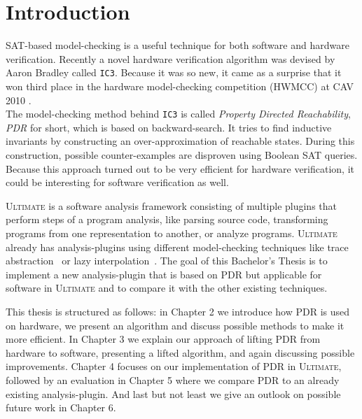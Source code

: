 \documentclass[11pt, a4paper, BCOR=10mm, ngerman]{scrbook}
\begin{document}
\tableofcontents


\mainmatter

\chapter{Introduction}
SAT-based model-checking is a useful technique for both software and hardware verification. 
Recently a novel hardware verification algorithm was devised by Aaron Bradley \cite{DBLP:conf/vmcai/Bradley11} called \texttt{IC3}.
Because it was so new, it came as a surprise that it won third place in the hardware
model-checking competition (HWMCC) at CAV 2010 \cite{cav}. \\ The model-checking method behind \texttt{IC3} is called \textsl{Property Directed Reachability}, \textsl{PDR} for short, which is based on backward-search. It tries to find inductive invariants by constructing an over-approximation of reachable states. During this construction, possible counter-examples are disproven using Boolean SAT queries. Because this approach turned out to be very efficient for hardware verification, it could be interesting for software verification as well. \par
\textsc{\textsc{Ultimate}} \cite{Zitat02} is a software analysis framework consisting of multiple plugins that perform steps of a program analysis, like parsing source code, transforming programs from one representation to another, or analyze programs.
 \textsc{\textsc{Ultimate}} already has analysis-plugins using different model-checking techniques like trace abstraction~\cite{DBLP:conf/cav/HeizmannHP13} or lazy interpolation~\cite{DBLP:conf/popl/HenzingerJMS02}.
The goal of this Bachelor's Thesis is to implement a new analysis-plugin that is based on PDR but applicable for software in \textsc{\textsc{Ultimate}} and to compare it with the other existing techniques. \par

This thesis is structured as follows: in Chapter 2 we introduce how PDR is used on hardware, we present an algorithm and discuss possible methods to make it more efficient. In Chapter 3 we explain our approach of lifting PDR from hardware to software, presenting a lifted algorithm, and again discussing possible improvements. Chapter 4 focuses on our implementation of PDR in \textsc{Ultimate}, followed by an evaluation in Chapter 5 where we compare PDR to an already existing analysis-plugin. And last but not least we give an outlook on possible future work in Chapter 6.
\end{document}
